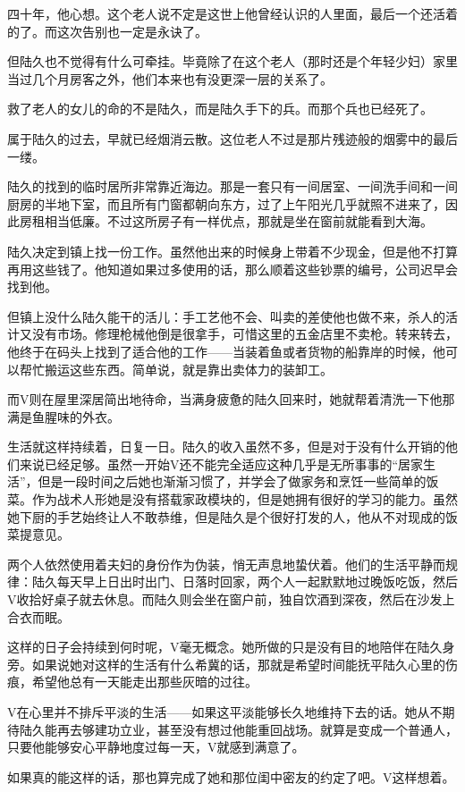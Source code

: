 四十年，他心想。这个老人说不定是这世上他曾经认识的人里面，最后一个还活着的了。而这次告别也一定是永诀了。

但陆久也不觉得有什么可牵挂。毕竟除了在这个老人（那时还是个年轻少妇）家里当过几个月房客之外，他们本来也有没更深一层的关系了。

救了老人的女儿的命的不是陆久，而是陆久手下的兵。而那个兵也已经死了。

属于陆久的过去，早就已经烟消云散。这位老人不过是那片残迹般的烟雾中的最后一缕。

陆久的找到的临时居所非常靠近海边。那是一套只有一间居室、一间洗手间和一间厨房的半地下室，而且所有门窗都朝向东方，过了上午阳光几乎就照不进来了，因此房租相当低廉。不过这所房子有一样优点，那就是坐在窗前就能看到大海。

陆久决定到镇上找一份工作。虽然他出来的时候身上带着不少现金，但是他不打算再用这些钱了。他知道如果过多使用的话，那么顺着这些钞票的编号，公司迟早会找到他。

但镇上没什么陆久能干的活儿：手工艺他不会、叫卖的差使他也做不来，杀人的活计又没有市场。修理枪械他倒是很拿手，可惜这里的五金店里不卖枪。转来转去，他终于在码头上找到了适合他的工作——当装着鱼或者货物的船靠岸的时候，他可以帮忙搬运这些东西。简单说，就是靠出卖体力的装卸工。

而V则在屋里深居简出地待命，当满身疲惫的陆久回来时，她就帮着清洗一下他那满是鱼腥味的外衣。

生活就这样持续着，日复一日。陆久的收入虽然不多，但是对于没有什么开销的他们来说已经足够。虽然一开始V还不能完全适应这种几乎是无所事事的“居家生活”，但是一段时间之后她也渐渐习惯了，并学会了做家务和烹饪一些简单的饭菜。作为战术人形她是没有搭载家政模块的，但是她拥有很好的学习的能力。虽然她下厨的手艺始终让人不敢恭维，但是陆久是个很好打发的人，他从不对现成的饭菜提意见。

两个人依然使用着夫妇的身份作为伪装，悄无声息地蛰伏着。他们的生活平静而规律：陆久每天早上日出时出门、日落时回家，两个人一起默默地过晚饭吃饭，然后V收拾好桌子就去休息。而陆久则会坐在窗户前，独自饮酒到深夜，然后在沙发上合衣而眠。

这样的日子会持续到何时呢，V毫无概念。她所做的只是没有目的地陪伴在陆久身旁。如果说她对这样的生活有什么希冀的话，那就是希望时间能抚平陆久心里的伤痕，希望他总有一天能走出那些灰暗的过往。

V在心里并不排斥平淡的生活——如果这平淡能够长久地维持下去的话。她从不期待陆久能再去够建功立业，甚至没有想过他能重回战场。就算是变成一个普通人，只要他能够安心平静地度过每一天，V就感到满意了。

如果真的能这样的话，那也算完成了她和那位闺中密友的约定了吧。V这样想着。

